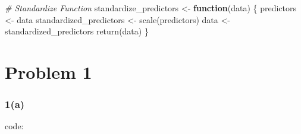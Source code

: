\documentclass[
]{article}
\newenvironment{Shaded}{\begin{snugshade}}{\end{snugshade}}
\newcommand{\CommentTok}[1]{\textcolor[rgb]{0.56,0.35,0.01}{\textit{#1}}}
\newcommand{\ControlFlowTok}[1]{\textcolor[rgb]{0.13,0.29,0.53}{\textbf{#1}}}
\newcommand{\DecValTok}[1]{\textcolor[rgb]{0.00,0.00,0.81}{#1}}
\newcommand{\FunctionTok}[1]{\textcolor[rgb]{0.00,0.00,0.00}{#1}}
\newcommand{\NormalTok}[1]{#1}
\newcommand{\OtherTok}[1]{\textcolor[rgb]{0.56,0.35,0.01}{#1}}
\newcommand{\SpecialCharTok}[1]{\textcolor[rgb]{0.00,0.00,0.00}{#1}}
\newcommand{\StringTok}[1]{\textcolor[rgb]{0.31,0.60,0.02}{#1}}
\begin{document}
\begin{Shaded}
\begin{Highlighting}[]
\CommentTok{\# Standardize Function}
\NormalTok{standardize\_predictors }\OtherTok{\textless{}{-}} \ControlFlowTok{function}\NormalTok{(data) \{}
\NormalTok{  predictors }\OtherTok{\textless{}{-}}\NormalTok{ data}
\NormalTok{  standardized\_predictors }\OtherTok{\textless{}{-}} \FunctionTok{scale}\NormalTok{(predictors)}
\NormalTok{  data }\OtherTok{\textless{}{-}}\NormalTok{ standardized\_predictors}
  \FunctionTok{return}\NormalTok{(data)}
\NormalTok{\}}
\end{Highlighting}
\end{Shaded}

\hypertarget{problem-1-1}{%
\section{Problem 1}\label{problem-1-1}}

\begin{Shaded}
\end{Shaded}

\hypertarget{a-4}{%
\subsubsection{1(a)}\label{a-4}}

code:
\end{document}

